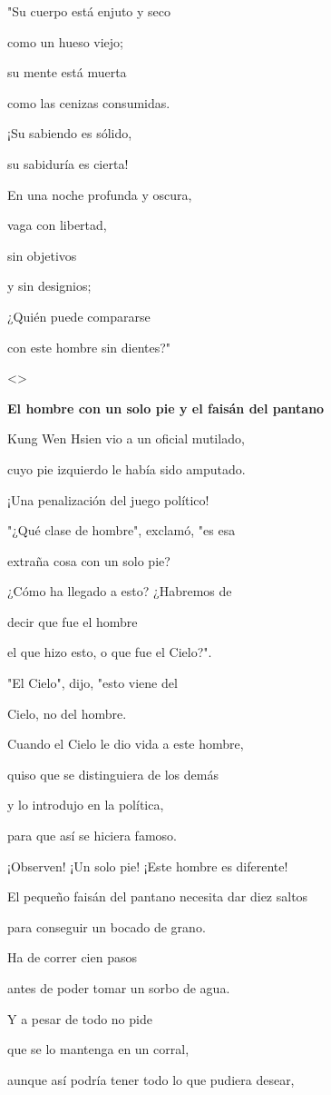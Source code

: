 "Su cuerpo está enjuto y seco

como un hueso viejo;

su mente está muerta

como las cenizas consumidas.

¡Su sabiendo es sólido,

su sabiduría es cierta!

En una noche profunda y oscura,

vaga con libertad,

sin objetivos

y sin designios;

¿Quién puede compararse

con este hombre sin dientes?"

\textless\textgreater{}

\textbf{{El hombre con un solo pie y el faisán del pantano}}

Kung Wen Hsien vio a un oficial mutilado,

cuyo pie izquierdo le había sido amputado.

¡Una penalización del juego político!

"¿Qué clase de hombre", exclamó, "es esa

extraña cosa con un solo pie?

¿Cómo ha llegado a esto? ¿Habremos de

decir que fue el hombre

el que hizo esto, o que fue el Cielo?".

"El Cielo", dijo, "esto viene del

Cielo, no del hombre.

Cuando el Cielo le dio vida a este hombre,

quiso que se distinguiera de los demás

y lo introdujo en la política,

para que así se hiciera famoso.

¡Observen! ¡Un solo pie! ¡Este hombre es diferente!

El pequeño faisán del pantano necesita dar diez saltos

para conseguir un bocado de grano.

Ha de correr cien pasos

antes de poder tomar un sorbo de agua.

Y a pesar de todo no pide

que se lo mantenga en un corral,

aunque así podría tener todo lo que pudiera desear,

